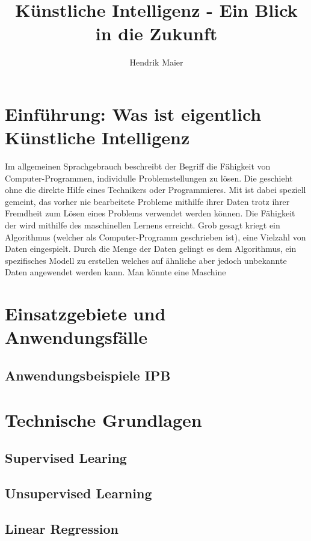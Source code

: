 \documentclass[12pt]{report}
\title{Künstliche Intelligenz - Ein Blick in die Zukunft}
\author{Hendrik Maier}
\date{}
\begin{document}
    \maketitle

    \tableofcontents
    \newpage

    \section{Einführung: Was ist eigentlich Künstliche Intelligenz}
    Im allgemeinen Sprachgebrauch beschreibt der Begriff  die Fähigkeit von Computer-Programmen,
    individulle Problemstellungen zu lösen. Die geschieht ohne die direkte Hilfe eines Technikers oder Programmieres.
    Mit  ist dabei speziell gemeint, das vorher nie bearbeitete Probleme mithilfe ihrer Daten
    trotz ihrer Fremdheit zum Lösen eines Problems verwendet werden können. Die Fähigkeit der 
    wird mithilfe des maschinellen Lernens erreicht. Grob gesagt kriegt ein Algorithmus (welcher als Computer-Programm geschrieben ist),
    eine Vielzahl von Daten eingespielt. Durch die Menge der Daten gelingt es dem Algorithmus, ein spezifisches
    Modell zu erstellen welches auf ähnliche aber jedoch unbekannte Daten angewendet werden kann.
    Man könnte eine Maschine


    \section{Einsatzgebiete und Anwendungsfälle}

    \subsection{Anwendungsbeispiele IPB}
    \section{Technische Grundlagen}
    \subsection{Supervised Learing}
    \subsection{Unsupervised Learning}
    \subsection{Linear Regression}
\end{document}
